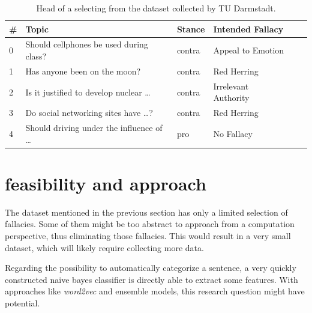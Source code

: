 \documentclass[a4paper]{article}
\begin{document}
\begin{table}[]
\centering
\caption{Head of a selecting from the dataset collected by TU Darmstadt.}
\label{my-label}
\begin{tabular}{@{}llllll@{}}
\toprule
\# & Topic                                                         & Stance & Intended Fallacy     \\ \midrule
0          & Should cellphones be used during class?                       & contra & Appeal to Emotion                 \\
1          & Has anyone been on the moon?                                  & contra & Red Herring                     \\
2          & Is it justified to develop nuclear \dots & contra & Irrelevant Authority       \\
3          & Do social networking sites have \dots? & contra & Red Herring                      \\
4          & Should driving under the influence of \dots   & pro    & No Fallacy            \\ \bottomrule
\end{tabular}
\end{table}

\section{feasibility and approach}
The dataset mentioned in the previous section has only a limited selection of fallacies. Some of them might be too abstract to approach from a computation perspective, thus eliminating those fallacies. This would result in a very small dataset, which will likely require collecting more data. 

Regarding the possibility to automatically categorize a sentence, a very quickly constructed naive bayes classifier is directly able to extract some features. With approaches like \emph{word2vec} and ensemble models, this research question might have potential.
\end{document}
